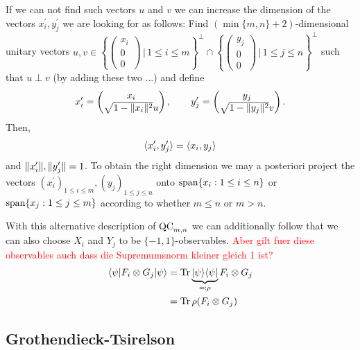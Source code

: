 	If we can not find such vectors $u$ and $v$ we can increase the dimension of the vectors $x_i^\prime,y_j^\prime$ we are looking for as follows: Find $(\min\{m,n\}+2)$-dimensional unitary vectors $u,v\in\left\{\begin{pmatrix} x_i \\ 0 \\ 0 \end{pmatrix} \,\bigg| \, 1\leq i \leq m\right\}^\perp \cap \left\{\begin{pmatrix} y_j \\ 0 \\ 0 \end{pmatrix}\,\bigg| \, 1\leq j \leq n\right\}^\perp$ such that $u\perp v$ (by adding these two ...) and define 
	\begin{align*}
		x_i^\prime = \begin{pmatrix}
			x_i \\ \sqrt{1- \Vert {x_i} \Vert^2}u
		\end{pmatrix},\qquad
		y_j^\prime = \begin{pmatrix}
			y_j \\ \sqrt{1- \Vert {y_j} \Vert^2}v
		\end{pmatrix}.
	\end{align*}
	Then,
	\begin{align*}
		\langle{x_i^\prime},{y_j^\prime}\rangle = \langle{x_i},{y_j}\rangle
	\end{align*}
	and $ \Vert {x_i^\prime} \Vert, \Vert {y_j^\prime} \Vert=1$.
	To obtain the right dimension we may a posteriori project the vectors $(x_i^\prime)_{1\leq i \leq m},(y_j)_{1\leq j \leq n}$ onto $\operatorname{span}\{x_i : 1\leq i \leq n\}$ or $\operatorname{span}\{x_j : 1\leq j \leq m\}$ according to whether $m\leq n$ or $m > n$.
	
	With this alternative description of $\textup{QC}_{m,n}$ we can additionally follow that we can also choose $X_i$ and $Y_j$ to be $\{-1,1\}$-observables. \textcolor{red}{Aber gilt fuer diese observables auch dass die Supremumsnorm kleiner gleich 1 ist?}
	\begin{align*}
		\langle {\psi} \vert F_i\otimes G_j \vert {\psi} \rangle &= \textup{Tr} \, {\underbrace{\vert {\psi} \rangle\langle {\psi} \vert}_{\eqqcolon\rho}F_i\otimes G_j}  \\
		&=\textup{Tr} \, {\rho(F_i\otimes G_j)} 
	\end{align*}

\subsection{Grothendieck-Tsirelson}

